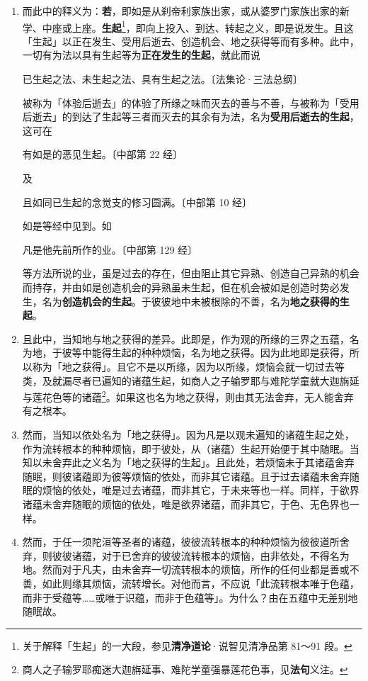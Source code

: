 \begin{enumerate}
\item 而此中的释义为：\textbf{若}，即如是从刹帝利家族出家，或从婆罗门家族出家的新学、中座或上座。\textbf{生起}\footnote{关于解释「生起」的一大段，参见\textbf{清净道论}·说智见清净品第 81～91 段。}，即向上投入、到达、转起之义，即是说发生。且这「生起」以正在发生、受用后逝去、创造机会、地之获得等而有多种。此中，一切有为法以具有生起等为\textbf{正在发生的生起}，就此而说\begin{quoting}已生起之法、未生起之法、具有生起之法。{\bluefootnotesize 〔法集论·三法总纲〕}\end{quoting}被称为「体验后逝去」的体验了所缘之味而灭去的善与不善，与被称为「受用后逝去」的到达了生起等三者而灭去的其余有为法，名为\textbf{受用后逝去的生起}，这可在\begin{quoting}有如是的恶见生起。{\bluefootnotesize 〔中部第 22 经〕}\end{quoting}及\begin{quoting}且如同已生起的念觉支的修习圆满。{\bluefootnotesize 〔中部第 10 经〕}\end{quoting}如是等经中见到。如\begin{quoting}凡是他先前所作的业。{\bluefootnotesize 〔中部第 129 经〕}\end{quoting}等方法所说的业，虽是过去的存在，但由阻止其它异熟、创造自己异熟的机会而持存，并由如是创造机会的异熟虽未生起，但在机会被如是创造时势必发生，名为\textbf{创造机会的生起}。于彼彼地中未被根除的不善，名为\textbf{地之获得的生起}。
\item 且此中，当知地与地之获得的差异。此即是，作为观的所缘的三界之五蕴，名为地，于彼等中能得生起的种种烦恼，名为地之获得。因为此地即是获得，所以称为「地之获得」。且它不是以所缘，因为以所缘，烦恼会就一切过去等类，及就漏尽者已遍知的诸蕴生起，如商人之子输罗耶与难陀学童就大迦旃延与莲花色等的诸蕴\footnote{商人之子输罗耶痴迷大迦旃延事、难陀学童强暴莲花色事，见\textbf{法句}义注。}。如果这也名为地之获得，则由其无法舍弃，无人能舍弃有之根本。
\item 然而，当知以依处名为「地之获得」。因为凡是以观未遍知的诸蕴生起之处，作为流转根本的种种烦恼，即于彼处，从（诸蕴）生起开始便于其中随眠。当知以未舍弃此之义名为「地之获得的生起」。且此处，若烦恼未于其诸蕴舍弃随眠，则彼诸蕴即为彼等烦恼的依处，而非其它诸蕴。且于过去诸蕴未舍弃随眠的烦恼的依处，唯是过去诸蕴，而非其它，于未来等也一样。同样，于欲界诸蕴未舍弃随眠的烦恼的依处，唯是欲界诸蕴，而非其它，于色、无色界也一样。
\item 然而，于任一须陀洹等圣者的诸蕴，彼彼流转根本的种种烦恼为彼彼道所舍弃，则彼彼诸蕴，对于已舍弃的彼彼流转根本的烦恼，由非依处，不得名为地。然而对于凡夫，由未舍弃一切流转根本的烦恼，所作的任何业都是善或不善，如此则缘其烦恼，流转增长。对他而言，不应说「此流转根本唯于色蕴，而非于受蕴等……或唯于识蕴，而非于色蕴等」。为什么？由在五蕴中无差别地随眠故。

\end{enumerate}
